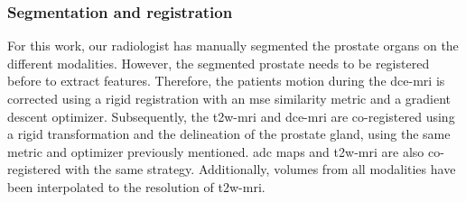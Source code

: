 \documentclass[conference]{sty/ieeeconf}
\begin{document}
\subsubsection{Segmentation and registration}\label{subsec:chp6:method:Seg-Reg}

For this work, our radiologist has manually segmented the prostate
organs on the different modalities.
However, the segmented prostate needs to be registered before to
extract features.
Therefore, the patients motion during the \ac{dce}-\ac{mri} is corrected using
a rigid registration with an \ac{mse} similarity metric and a gradient descent
optimizer.
Subsequently, the \ac{t2w}-\ac{mri} and \ac{dce}-\ac{mri} are co-registered
using a rigid transformation and the delineation of the prostate gland, using
the same metric and optimizer previously mentioned.
\ac{adc} maps and \ac{t2w}-\ac{mri} are also co-registered with the same
strategy.
Additionally, volumes from all modalities have been interpolated to the
resolution of \ac{t2w}-\ac{mri}.
\end{document}
